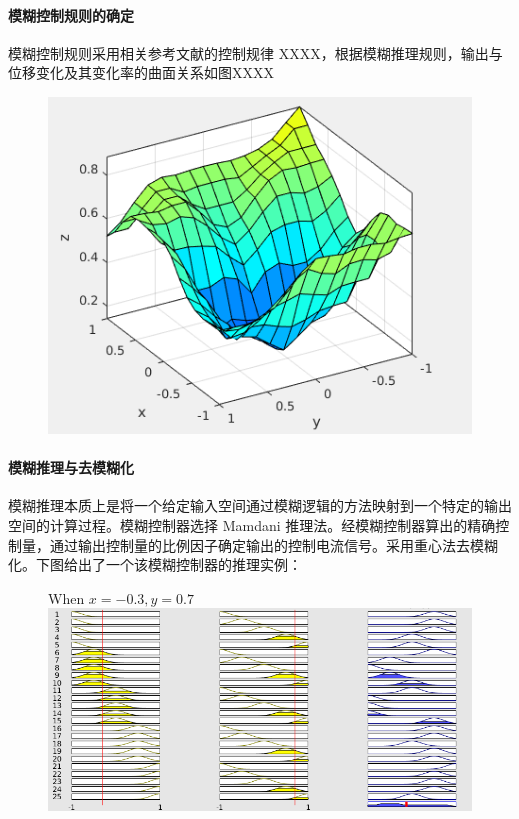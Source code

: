 \paragraph{模糊控制规则的确定}
\qquad 模糊控制规则采用相关参考文献的控制规律 XXXX，根据模糊推理规则，输出与位移变化及其变化率的曲面关系如图XXXX
\begin{figure}[H]
\centering
\includegraphics[width=0.5\linewidth]{figure/fuzzysurface}
\end{figure}

\paragraph{模糊推理与去模糊化}
\qquad 模糊推理本质上是将一个给定输入空间通过模糊逻辑的方法映射到一个特定的输出空间的计算过程。模糊控制器选择 Mamdani 推理法。经模糊控制器算出的精确控制量，通过输出控制量的比例因子确定输出的控制电流信号。采用重心法去模糊化。下图给出了一个该模糊控制器的推理实例：

\begin{figure}[H]
\centering
{}
{When $x=-0.3,y=0.7$}
\includegraphics[width=0.5\linewidth]{figure/fuzzyeg}
\end{figure}


%

